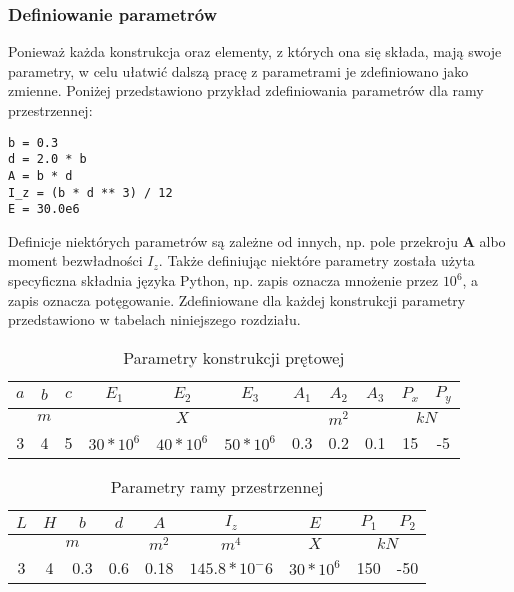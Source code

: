 \subsubsection{Definiowanie parametrów}

Ponieważ każda konstrukcja oraz elementy, z których ona się składa, mają swoje parametry, w celu ułatwić dalszą pracę z parametrami
je zdefiniowano jako zmienne.
Poniżej przedstawiono przykład zdefiniowania parametrów dla ramy przestrzennej:

\begin{lstlisting}
b = 0.3
d = 2.0 * b
A = b * d
I_z = (b * d ** 3) / 12
E = 30.0e6
\end{lstlisting}

Definicje niektórych parametrów są zależne od innych, np. pole przekroju \textbf{A} albo moment bezwładności \textbf{$I_z$}.
Także definiując niektóre parametry została użyta specyficzna składnia języka Python, np. zapis  oznacza mnożenie
przez \textbf{$10^6$}, a zapis \inlinecode{**} oznacza potęgowanie.
Zdefiniowane dla każdej konstrukcji parametry przedstawiono w tabelach niniejszego rozdziału.

\begin{table}[!htbp]
    \centering
    \begin{tabular}{|c|c|c|c|c|c|c|c|c|c|c|}
        \hline
        $a$ & $b$ & $c$ & $E_1$ & $E_2$ & $E_3$ & $A_1$ & $A_2$ & $A_3$ & $P_x$ & $P_y$ \\
        \hline
        \multicolumn{3}{|c|}{$m$} & \multicolumn{3}{|c|}{$X$} & \multicolumn{3}{|c|}{$m^2$} & \multicolumn{2}{|c|}{$kN$} \\
        \hline
        3 & 4 & 5 & $30*10^6$ & $40*10^6$ & $50*10^6$ & 0.3 & 0.2 & 0.1 & 15 & -5 \\
        \hline
    \end{tabular}
    \caption{Parametry konstrukcji prętowej}
    \label{tab:pars-kp}
\end{table}

\begin{table}[!htbp]
    \centering
    \begin{tabular}{|c|c|c|c|c|c|c|c|c|}
        \hline
        $L$ & $H$ & $b$ & $d$ & $A$ & $I_z$ & $E$ & $P_1$ & $P_2$ \\
        \hline
        \multicolumn{4}{|c|}{$m$} & $m^2$ & $m^4$ & $X$ & \multicolumn{2}{|c|}{$kN$} \\
        \hline
        3 & 4 & 0.3 & 0.6 & 0.18 & $145.8*10^-6$ & $30*10^6$ & 150 & -50 \\
        \hline
    \end{tabular}
    \caption{Parametry ramy przestrzennej}
    \label{tab:pars-rama}
\end{table}

